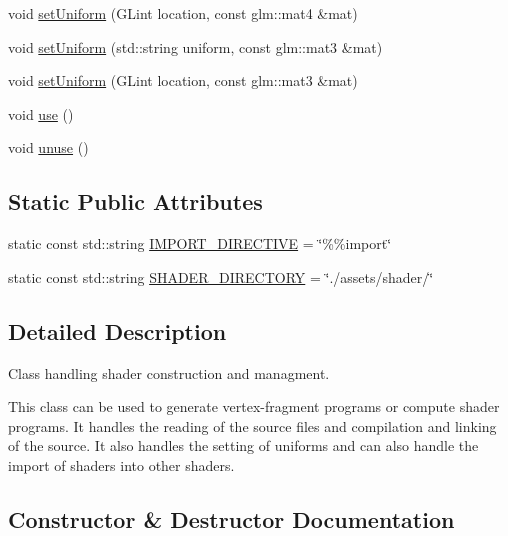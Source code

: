 \begin{DoxyCompactItemize}
\item 
void \mbox{\hyperlink{class_shader_a46355ed56b88314db5d718d4a62d35c8}{set\+Uniform}} (G\+Lint location, const glm\+::mat4 \&mat)
\item 
void \mbox{\hyperlink{class_shader_acfe710bb28287970d342326fb0c48eb4}{set\+Uniform}} (std\+::string uniform, const glm\+::mat3 \&mat)
\item 
void \mbox{\hyperlink{class_shader_a043b7949a585fab2da3d8f1c060dfe47}{set\+Uniform}} (G\+Lint location, const glm\+::mat3 \&mat)
\item 
void \mbox{\hyperlink{class_shader_a870fa9f13d69e558815d6fd351a469dc}{use}} ()
\item 
void \mbox{\hyperlink{class_shader_a8eb0c22bd8a71aaf85f4ce7a4102fa34}{unuse}} ()
\end{DoxyCompactItemize}
\subsection*{Static Public Attributes}
\begin{DoxyCompactItemize}
\item 
static const std\+::string \mbox{\hyperlink{class_shader_aa6e44073d2057294985c44d4026bfe76}{I\+M\+P\+O\+R\+T\+\_\+\+D\+I\+R\+E\+C\+T\+I\+VE}} = \char`\"{}\%\%import\char`\"{}
\item 
static const std\+::string \mbox{\hyperlink{class_shader_aa455d9f9902f2c9ac34fb6a3103b86d1}{S\+H\+A\+D\+E\+R\+\_\+\+D\+I\+R\+E\+C\+T\+O\+RY}} = \char`\"{}./assets/shader/\char`\"{}
\end{DoxyCompactItemize}


\subsection{Detailed Description}
Class handling shader construction and managment. 

This class can be used to generate vertex-\/fragment programs or compute shader programs. It handles the reading of the source files and compilation and linking of the source. It also handles the setting of uniforms and can also handle the import of shaders into other shaders. 

\subsection{Constructor \& Destructor Documentation}
\mbox{\label{class_shader_a76576a620ff181bb85d22e6ab69c0c82}} 
